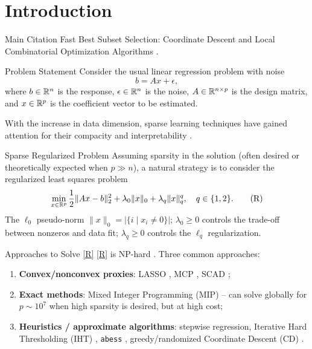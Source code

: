 \section{Introduction}

\begin{frame}{Main Citation}
    Fast Best Subset Selection: Coordinate Descent and Local Combinatorial Optimization Algorithms \cite{fastselect}.
\end{frame}

\begin{frame}{Problem Statement}
Consider the usual linear regression problem with noise
\[
b = Ax + \epsilon, \tag{P}\label{P}
\]
where $b \in \mathbb{R}^n$ is the response, $\epsilon \in \mathbb{R}^n$ is the noise, 
$A \in \mathbb{R}^{n \times p}$ is the design matrix, and $x \in \mathbb{R}^p$ is the coefficient vector 
to be estimated.

With the increase in data dimension, sparse learning techniques have gained attention 
for their compacity and interpretability \cite{statsparse,stathigh}.
\end{frame}

\begin{frame}{Sparse Regularized Problem}
Assuming sparsity in the solution (often desired or theoretically expected when $p \gg n$), a natural strategy is to consider the regularized least squares problem
\[
\min_{x \in \mathbb{R}^p} \frac{1}{2} \|Ax-b\|_2^2 + \lambda_0 \|x\|_0 + \lambda_q \|x\|_q^q,\quad q \in \{1,2\}. \tag{R}\label{R}
\]
The $\ell_0$ pseudo-norm $\|x\|_0 = |\{i \mid x_i \neq 0\}|$; $\lambda_0 \ge 0$ controls the trade-off between nonzeros and data fit; $\lambda_q \ge 0$ controls the $\ell_q$ regularization.
\end{frame}

\begin{frame}{Approaches to Solve \eqref{R}}
\eqref{R} is NP-hard \cite{nphard}. Three common approaches:
\begin{enumerate}
\item \textbf{Convex/nonconvex proxies}: LASSO \cite{lasso}, MCP \cite{mcp}, SCAD \cite{scad};
\item \textbf{Exact methods}: Mixed Integer Programming (MIP) \cite{mio} – can solve globally for $p \sim 10^7$ when high sparsity is desired, but at high cost;
\item \textbf{Heuristics / approximate algorithms}: stepwise regression, Iterative Hard Thresholding (IHT) \cite{iht}, \texttt{abess} \cite{abess}, greedy/randomized Coordinate Descent (CD) \cite{gcd,rcd}.
\end{enumerate}
\end{frame}


